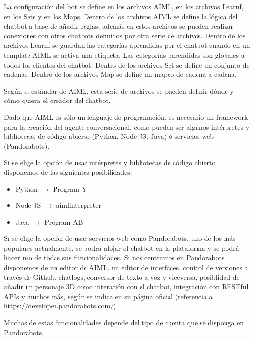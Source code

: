 La configuración del bot se define en los archivos AIML, en los archivos Learnf, en los Sets y en los Maps. Dentro de los archivos AIML se define la lógica del chatbot a base de añadir reglas, además en estos archivos se pueden realizar conexiones con otros chatbots definidos por otra serie de archivos. Dentro de los archivos Learnf se guardan las categorías aprendidas por el chatbot cuando en un template AIML se activa una etiqueta. Las categorías parendidas son globales a todos los clientes del chatbot. Dentro de los archivos Set se define un conjunto de cadenas. Dentro de los archivos Map se define un mapeo de cadena a cadena.

Según el estándar de AIML, esta serie de archivos se pueden definir dónde y cómo quiera el creador del chatbot.

Dado que AIML es sólo un lenguaje de programación, es necesario un framework para la creación del agente conversacional, como pueden ser algunos intérpretes y bibliotecas de código abierto (Python, Node JS, Java) ó servicios web (Pandorabots).

Si se elige la opción de usar intérpretes y bibliotecas de código abierto disponemos de las siguientes posibilidades:

\begin{itemize}
    \item Python $\rightarrow$ Program-Y
    \item Node JS $\rightarrow$ aimlinterpreter
    \item Java $\rightarrow$ Program AB
\end{itemize}

Si se elige la opción de usar servicios web como Pandorabots, uno de los más populares actualmente, se podrá alojar el chatbot en la plataforma y se podrá hacer uso de todas sus funcionalidades. Si nos centramos en Pandorabots disponemos de un editor de AIML, un editor de interfaces, control de versiones a través de Github, chatlogs, conversor de texto a voz y viceversa, posiblidad de añadir un personaje 3D como interación con el chatbot, integración con RESTful APIs y muchos más, según se indica en su página oficial (referencia a https://developer.pandorabots.com/).

Muchas de estas funcionalidades depende del tipo de cuenta que se disponga en Pandorabots.

\newpage

